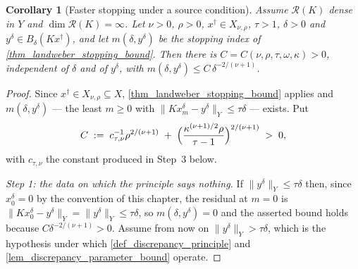 \documentclass[a4paper]{report}
\theoremstyle{plain}
\newtheorem{corollary}[theorem]{Corollary}
\theoremstyle{definition}
\theoremstyle{remark}
\newcommand{\Ran}{\mathcal{R}}
\newcommand{\dg}{^{\dagger}}
\begin{document}
\begin{corollary}[Faster stopping under a source condition]
  \label{cor_landweber_stopping_rate}
  Assume $\Ran(K)$ dense in $Y$ and $\dim\Ran(K) = \infty$.  Let $\nu > 0$, $\rho > 0$,
  $x\dg \in X_{\nu,\rho}$, $\tau > 1$, $\delta > 0$ and $y^{\delta} \in B_{\delta}(Kx\dg)$,
  and let $m(\delta,y^{\delta})$ be the stopping index of
  \cref{thm_landweber_stopping_bound}.  Then there is
  $C = C(\nu,\rho,\tau,\omega,\kappa) > 0$, independent of $\delta$ and of $y^{\delta}$,
  with $m(\delta,y^{\delta}) \le C\,\delta^{-2/(\nu+1)}$.
\end{corollary}

\begin{proof}


  Since $x\dg \in X_{\nu,\rho} \subseteq X$, \cref{thm_landweber_stopping_bound} applies
  and $m(\delta,y^{\delta})$ --- the least $m \ge 0$ with
  $\|Kx^{\delta}_m - y^{\delta}\|_Y \le \tau\delta$ --- exists.  Put
  \[
    C \;:=\; c_{\tau,\nu}^{-1}\rho^{2/(\nu+1)}
      \;+\; \Bigl(\frac{\kappa^{(\nu+1)/2}\rho}{\tau-1}\Bigr)^{2/(\nu+1)} \;>\; 0 ,
  \]
  with $c_{\tau,\nu}$ the constant produced in Step~3 below.

  \emph{Step 1: the data on which the principle says nothing.}  If
  $\|y^{\delta}\|_Y \le \tau\delta$ then, since $x^{\delta}_0 = 0$ by the convention of
  this chapter, the residual at $m = 0$ is $\|Kx^{\delta}_0 - y^{\delta}\|_Y =
  \|y^{\delta}\|_Y \le \tau\delta$, so $m(\delta,y^{\delta}) = 0$ and the asserted bound
  holds because $C\delta^{-2/(\nu+1)} > 0$.  Assume from now on
  $\|y^{\delta}\|_Y > \tau\delta$, which is the hypothesis under which
  \cref{def_discrepancy_principle} and \cref{lem_discrepancy_parameter_bound} operate.


\end{proof}
\end{document}
